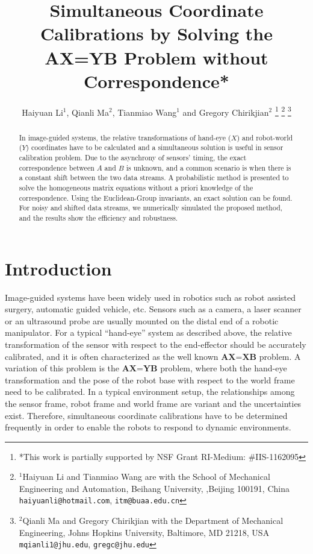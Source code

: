 \documentclass[letterpaper, 10 pt, conference]{ieeeconf}  %
\title{\LARGE \bf
Simultaneous Coordinate Calibrations by Solving the AX=YB Problem without Correspondence*
}
\author{Haiyuan Li$^{1}$, Qianli Ma$^{2}$, Tianmiao Wang$^{1}$ and Gregory Chirikjian$^{2}$%
\thanks{*This work is partially
supported by NSF Grant RI-Medium: \#IIS-1162095}%
\thanks{$^{1}$Haiyuan Li and Tianmiao Wang are with the School of Mechanical Engineering and Automation, Beihang University,
        ,Beijing 100191, China
        {\tt\small haiyuanli@hotmail.com}, {\tt\small itm@buaa.edu.cn}}%
\thanks{$^{2}$Qianli Ma and Gregory Chirikjian with the Department of Mechanical Engineering, Johns Hopkins University,
        Baltimore, MD 21218, USA
        {\tt\small mqianli1@jhu.edu}, {\tt\small gregc@jhu.edu}}%
}
\begin{document}
\maketitle
\thispagestyle{empty}
\pagestyle{empty}


\begin{abstract}

In image-guided systems, the relative transformations of hand-eye ($X$) and robot-world ($Y$) coordinates have to be calculated and a simultaneous solution is useful in sensor calibration problem. Due to the asynchrony of sensors' timing, the exact correspondence between $A$ and $B$ is unknown, and a common scenario is when there is a constant shift between the two data streams. A probabilistic method is presented to solve the
homogeneous matrix equations without a priori knowledge of the correspondence. Using the Euclidean-Group invariants, an exact solution can be found. For noisy and shifted data streams, we numerically simulated the proposed method, and the results show the efficiency and robustness.

\end{abstract}



\section{Introduction}

Image-guided systems have been widely used in robotics such as robot assisted surgery, automatic guided vehicle, etc. Sensors such as a camera, a laser scanner or an ultrasound probe are usually mounted on the distal end of a robotic manipulator. For a typical ``hand-eye'' system as described above, the relative transformation of the sensor with respect to the end-effector should be accurately calibrated, and it is often characterized as the well known $\textbf{AX=XB}$ problem. A variation of this problem is the $\textbf{AX=YB}$ problem, where both the hand-eye transformation and the pose of the robot base with respect to the world frame need to be calibrated. In a typical environment setup, the relationships among the sensor frame, robot frame and world frame are variant and the uncertainties exist. Therefore, simultaneous coordinate calibrations have to be determined frequently in order to enable the robots to respond to dynamic environments.
\end{document}
